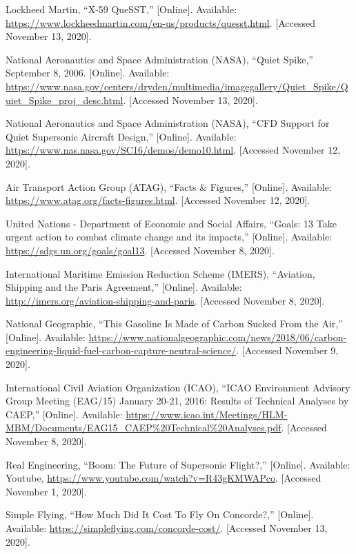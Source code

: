 \documentclass[a4paper,11pt]{article}
\begin{document}
\begin{thebibliography}
{Lockheed Martin},
{``X-59 QueSST,''}
[Online]. Available:
\url{https://www.lockheedmartin.com/en-us/products/quesst.html}.
[Accessed November 13, 2020].

{National Aeronautics and Space Administration (NASA),}
{``Quiet Spike,''} September 8, 2006.
[Online]. Available:
\url{https://www.nasa.gov/centers/dryden/multimedia/imagegallery/Quiet_Spike/Quiet_Spike_proj_desc.html}.
[Accessed November 13, 2020].

{National Aeronautics and Space Administration (NASA),}
{``CFD Support for Quiet Supersonic Aircraft Design,''}
[Online]. Available:
\url{https://www.nas.nasa.gov/SC16/demos/demo10.html}.
[Accessed November 12, 2020].

{Air Transport Action Group (ATAG),}
{``Facts \& Figures,''}
[Online]. Available:
\url{https://www.atag.org/facts-figures.html}.
[Accessed November 12, 2020].

{United Nations - Department of Economic and Social Affairs,}
{``Goals: 13 Take urgent action to combat climate change and its impacts,''}
[Online]. Available:
\url{https://sdgs.un.org/goals/goal13}.
[Accessed November 8, 2020].

{International Maritime Emission Reduction Scheme (IMERS),}
{``Aviation, Shipping and the Paris Agreement,''}
[Online]. Available:
\url{http://imers.org/aviation-shipping-and-paris}.
[Accessed November 8, 2020].

{National Geographic,}
{``This Gasoline Is Made of Carbon Sucked From the Air,''}
[Online]. Available:
\url{https://www.nationalgeographic.com/news/2018/06/carbon-engineering-liquid-fuel-carbon-capture-neutral-science/}.
[Accessed November 9, 2020].

{International Civil Aviation Organization (ICAO),}
{``ICAO Environment Advisory Group Meeting (EAG/15)
January 20-21, 2016: Results of Technical Analyses by CAEP,''}
[Online]. Available:
\url{https://www.icao.int/Meetings/HLM-MBM/Documents/EAG15_CAEP\%20Technical\%20Analyses.pdf}.
[Accessed November 8, 2020].

{Real Engineering},
{``Boom: The Future of Supersonic Flight?,''}
[Online]. Available: Youtube,
\url{https://www.youtube.com/watch?v=R43gKMWAPco}.
[Accessed November 1, 2020].

{Simple Flying,}
{``How Much Did It Cost To Fly On Concorde?,''}
[Online]. Available:
\url{https://simpleflying.com/concorde-cost/}.
[Accessed November 13, 2020].


\end{thebibliography}
\end{document}
